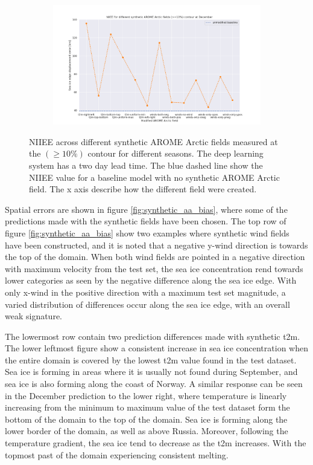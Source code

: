 \documentclass[../main/thesis.tex]{subfiles}
\begin{document}
\begin{figure}
\begin{subfigure}{.49\textwidth}
    \end{subfigure}
    \begin{subfigure}{.49\textwidth}
        \includegraphics[width=\textwidth]{NIIEE_12.png}
    \end{subfigure}
    \caption{\label{fig:synthetic_aa_niiee}NIIEE across different synthetic AROME Arctic fields measured at the $(\geq10\%)$ contour for different seasons. The deep learning system has a two day lead time. The blue dashed line show the NIIEE value for a baseline model with no synthetic AROME Arctic field. The x axis describe how the different field were created.}
\end{figure}

Spatial errors are shown in figure \ref{fig:synthetic_aa_bias}, where some of the predictions made with the synthetic fields have been chosen. The top row of figure \ref{fig:synthetic_aa_bias} show two examples where synthetic wind fields have been constructed, and it is noted that a negative y-wind direction is towards the top of the domain. When both wind fields are pointed in a negative direction with maximum velocity from the test set, the sea ice concentration rend towards lower categories as seen by the negative difference along the sea ice edge. With only x-wind in the positive direction with a maximum test set magnitude, a varied distribution of differences occur along the sea ice edge, with an overall weak signature.

The lowermost row contain two prediction differences made with synthetic t2m. The lower leftmost figure show a consistent increase in sea ice concentration when the entire domain is covered by the lowest t2m value found in the test dataset. Sea ice is forming in areas where it is usually not found during September, and sea ice is also forming along the coast of Norway. A similar response can be seen in the December prediction to the lower right, where temperature is linearly increasing from the minimum to maximum value of the test dataset form the bottom of the domain to the top of the domain. Sea ice is forming along the lower border of the domain, as well as above Russia. Moreover, following the temperature gradient, the sea ice tend to decrease as the t2m increases. With the topmost past of the domain experiencing consistent melting.
\end{document}
